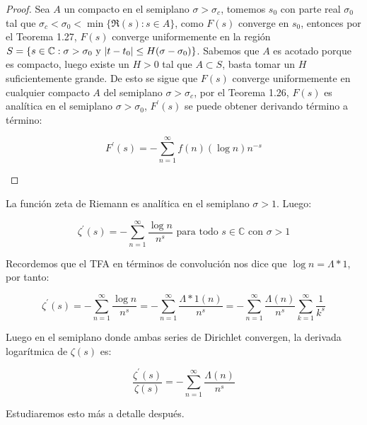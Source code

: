 \begin{proof}
Sea $A$ un compacto en el semiplano $\sigma>\sigma_c$, tomemos $s_0$ con parte real $\sigma_0$ tal que $\sigma_c<\sigma_0<\min\{\Re(s): s\in A\}$, como $F(s)$ converge en $s_0$, entonces por el Teorema 1.27, $F(s)$ converge uniformemente en la región $S=\{s\in \mathbb{C} : \sigma>\sigma_0 \text{ y } |t-t_0|\leq H(\sigma-\sigma_0)\}$. Sabemos que $A$ es acotado porque es compacto, luego existe un $H>0$ tal que $A\subset S$, basta tomar un $H$ suficientemente grande. De  esto se sigue que $F(s)$ converge uniformemente en cualquier compacto $A$ del semiplano $\sigma>\sigma_c$, por el Teorema 1.26, $F(s)$ es analítica en el semiplano $\sigma>\sigma_0$, $F^{\prime}(s)$ se puede obtener derivando término a término:

$$F^{\prime}(s)=-\sum_{n=1}^{\infty} f(n)(\log n) n^{-s}$$
\begin{center}

\end{center}
\end{proof}

\begin{corollary}
La función zeta de Riemann es analítica en el semiplano $\sigma>1$. Luego:

$$\zeta^{\prime}(s)=-\sum_{n=1}^{\infty}\frac{\log n}{n^s} \text{ para todo } s \in \mathbb{C} \text{ con } \sigma>1$$
\end{corollary}

Recordemos que el TFA en términos de convolución nos dice que $\log n=\Lambda*1$, por tanto:

$$\zeta^{\prime}(s)=-\sum_{n=1}^{\infty}\frac{\log n}{n^s}=-\sum_{n=1}^{\infty}\frac{\Lambda *1(n)}{n^s}=-\sum_{n=1}^{\infty}\frac{\Lambda(n)}{n^s}\sum_{k=1}^{\infty} \frac{1}{k^s} $$

Luego en el semiplano donde  ambas series de Dirichlet convergen, la derivada logarítmica de $\zeta(s)$ es:


$$\frac{\zeta^{\prime}(s)}{\zeta(s)}=-\sum_{n=1}^{\infty} \frac{\Lambda(n)}{n^s}$$

Estudiaremos esto más a detalle después.
